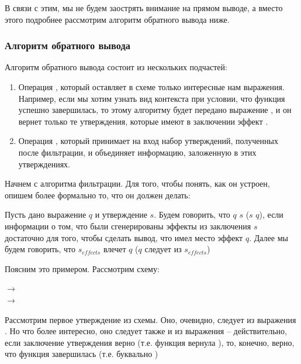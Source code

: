 В связи с этим, мы не будем заострять внимание на прямом выводе, а вместо этого подробнее рассмотрим алгоритм обратного вывода ниже.


\subsubsection{Алгоритм обратного вывода}

\label{section-back-inference}

Алгоритм обратного вывода состоит из нескольких подчастей:

\begin{enumerate}
    \item Операция , который оставляет в схеме только интересные нам выражения. Например, если мы хотим узнать вид контекста при условии, что функция успешно завершилась, то этому алгоритму будет передано выражение , и он вернет только те утверждения, которые имеют в заключении эффект .

    \item Операция , который принимает на вход набор утверждений, полученных после фильтрации, и объединяет информацию, заложенную в этих утверждениях.
\end{enumerate}

Начнем с алгоритма фильтрации. Для того, чтобы понять, как он устроен, опишем более формально то, что он должен делать:

\begin{definition}
    Пусть дано выражение $q$ и утверждение $s$. Будем говорить, что $q$  $s$ ($s$  $q$), если информации о том, что были сгенерированы эффекты из заключения $s$ достаточно для того, чтобы сделать вывод, что  имел место эффект $q$. Далее мы будем говорить, что $s_{effects}$ влечет $q$ ($q$ следует из $s_{effects}$)
\end{definition}

Поясним это примером. Рассмотрим схему:

{
     $\rightarrow$  \\
     $\rightarrow$ 
}{}

Рассмотрим первое утверждение из схемы. Оно, очевидно, следует из выражения . Но что более интересно, оно следует также и из выражения  -- действительно, если заключение утверждения верно (т.е. функция вернула ), то, конечно, верно, что функция завершилась (т.е. буквально )



